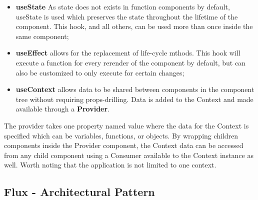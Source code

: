 \begin{itemize}
    \item \textbf{useState} As state does not exists in function components by default, useState is used which preserves the state throughout the lifetime of the component. This hook, and all others, can be used more than once inside the same component;
    \item \textbf{useEffect} allows for the replacement of life-cycle mthods. This hook will execute a function for every rerender of the component by default, but can also be customized to only execute for certain changes;
    \item \textbf{useContext} allows data to be shared between components in the component tree without requiring props-drilling. Data is added to the Context and made available through a \textbf{Provider}.
\end{itemize}




The provider takes one property named value where the data for the Context is specified which can be variables, functions, or objects. By wrapping children components inside the Provider component, the Context data can be accessed from any child component using a Consumer available to the Context instance as well. Worth noting that the application is not limited to one context.

\subsection{Flux - Architectural Pattern}
\label{ss:flux}


